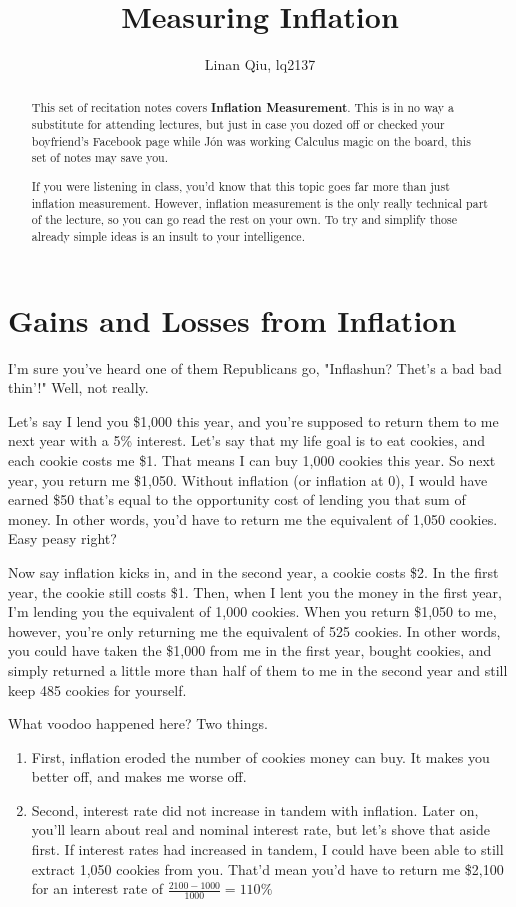 \documentclass[11pt]{scrartcl}
\title{Measuring Inflation}
\author{Linan Qiu, lq2137}
\newcommand{\jon}{J\'{o}n }
\begin{document}
\maketitle

\begin{abstract}
This set of recitation notes covers \textbf{Inflation Measurement}. This is in no way a substitute for attending lectures, but just in case you dozed off or checked your boyfriend's Facebook page while \jon was working Calculus magic on the board, this set of notes may save you.

If you were listening in class, you'd know that this topic goes far more than just inflation measurement. However, inflation measurement is the only really technical part of the lecture, so you can go read the rest on your own. To try and simplify those already simple ideas is an insult to your intelligence.
\end{abstract}

\section{Gains and Losses from Inflation}

I'm sure you've heard one of them Republicans go, "Inflashun? Thet's a bad bad thin'!" Well, not really.

Let's say I lend you \$1,000 this year, and you're supposed to return them to me next year with a 5\% interest. Let's say that my life goal is to eat cookies, and each cookie costs me \$1. That means I can buy 1,000 cookies this year. So next year, you return me \$1,050. Without inflation (or inflation at 0), I would have earned \$50 that's equal to the opportunity cost of lending you that sum of money. In other words, you'd have to return me the equivalent of 1,050 cookies. Easy peasy right?

Now say inflation kicks in, and in the second year, a cookie costs \$2. In the first year, the cookie still costs \$1. Then, when I lent you the money in the first year, I'm lending you the equivalent of 1,000 cookies. When you return \$1,050 to me, however, you're only returning me the equivalent of 525 cookies. In other words, you could have taken the \$1,000 from me in the first year, bought cookies, and simply returned a little more than half of them to me in the second year and still keep 485 cookies for yourself.

What voodoo happened here? Two things.

\begin{enumerate}
\item First, inflation eroded the number of cookies money can buy. It makes you better off, and makes me worse off.
\item Second, interest rate did not increase in tandem with inflation. Later on, you'll learn about real and nominal interest rate, but let's shove that aside first. If interest rates had increased in tandem, I could have been able to still extract 1,050 cookies from you. That'd mean you'd have to return me \$2,100 for an interest rate of $\frac{2100 - 1000}{1000} = 110\%$
\end{enumerate}
\end{document}
